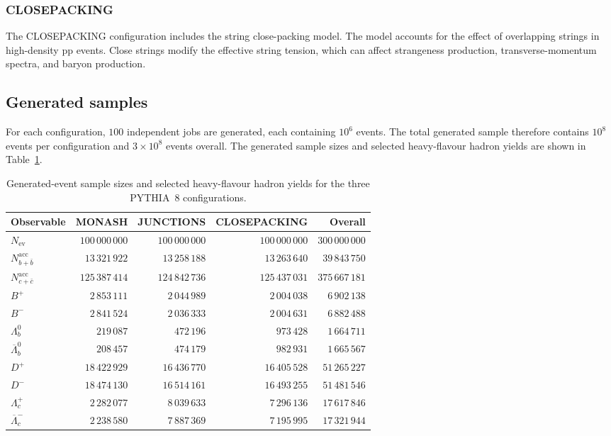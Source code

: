 \subsubsection{CLOSEPACKING}
\label{sec:closepacking}

The CLOSEPACKING configuration includes the string close-packing model.  The model accounts for the effect of overlapping strings in high-density pp events.  Close strings modify the effective string tension, which can affect strangeness production, transverse-momentum spectra, and baryon production.

\subsection{Generated samples}
\label{sec:generated-samples}

For each configuration, $100$ independent jobs are generated, each containing $10^{6}$ events.  The total generated sample therefore contains $10^{8}$ events per configuration and $3\times10^{8}$ events overall.  The generated sample sizes and selected heavy-flavour hadron yields are shown in Table~\ref{tab:generated-heavy-flavour-summary}.

\begin{table}[tbp]
\centering
\label{tab:generated-heavy-flavour-summary}
\begin{tabular}{lrrrr}
\toprule
Observable & MONASH & JUNCTIONS & CLOSEPACKING & Overall \\
\midrule
$N_{\mathrm{ev}}$ & $100\,000\,000$ & $100\,000\,000$ & $100\,000\,000$ & $300\,000\,000$ \\
$N_{b+\bar b}^{\mathrm{acc}}$ & $13\,321\,922$ & $13\,258\,188$ & $13\,263\,640$ & $39\,843\,750$ \\
$N_{c+\bar c}^{\mathrm{acc}}$ & $125\,387\,414$ & $124\,842\,736$ & $125\,437\,031$ & $375\,667\,181$ \\
\midrule
$B^{+}$ & $2\,853\,111$ & $2\,044\,989$ & $2\,004\,038$ & $6\,902\,138$ \\
$B^{-}$ & $2\,841\,524$ & $2\,036\,333$ & $2\,004\,631$ & $6\,882\,488$ \\
$\Lambda_{b}^{0}$ & $219\,087$ & $472\,196$ & $973\,428$ & $1\,664\,711$ \\
$\overline{\Lambda}_{b}^{0}$ & $208\,457$ & $474\,179$ & $982\,931$ & $1\,665\,567$ \\
$D^{+}$ & $18\,422\,929$ & $16\,436\,770$ & $16\,405\,528$ & $51\,265\,227$ \\
$D^{-}$ & $18\,474\,130$ & $16\,514\,161$ & $16\,493\,255$ & $51\,481\,546$ \\
$\Lambda_{c}^{+}$ & $2\,282\,077$ & $8\,039\,633$ & $7\,296\,136$ & $17\,617\,846$ \\
$\overline{\Lambda}_{c}^{-}$ & $2\,238\,580$ & $7\,887\,369$ & $7\,195\,995$ & $17\,321\,944$ \\
\bottomrule
\end{tabular}
\caption{Generated-event sample sizes and selected heavy-flavour hadron yields for the three PYTHIA~8 configurations.}
\end{table}

